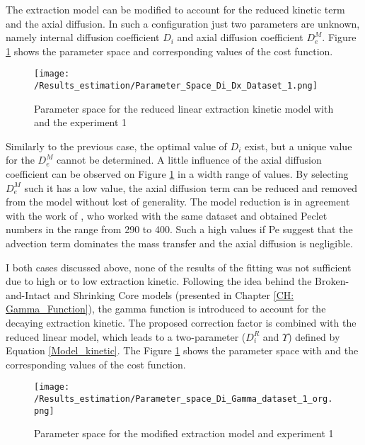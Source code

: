 \documentclass[../Supercritical_fluid_extraction_of_essential_oil_from_chamomile.tex]{subfiles}
\begin{document}
	The extraction model can be modified to account for the reduced kinetic term and the axial diffusion. In such a configuration just two parameters are unknown, namely internal diffusion coefficient $D_i$ and axial diffusion coefficient $D_e^M$. Figure \ref{fig: Fit_1_Di_Dx} shows the parameter space and corresponding values of the cost function.
	
	\begin{figure}[!h]
		\centering
		\texttt{[image: /Results\_estimation/Parameter\_Space\_Di\_Dx\_Dataset\_1.png]}
		\caption{Parameter space for the reduced linear extraction kinetic model with and the experiment 1}
		\label{fig: Fit_1_Di_Dx}
	\end{figure}
	
	Similarly to the previous case, the optimal value of $D_i$ exist, but a unique value for the $D_e^M$ cannot be determined. A little influence of the axial diffusion coefficient can be observed on Figure \ref{fig: Fit_1_Di_Dx} in a width range of values. By selecting $D_e^M$ such it has a low value, the axial diffusion term can be reduced and removed from the model without lost of generality. The model reduction is in agreement with the work of \citet{Rahimi2011}, who worked with the same dataset and obtained Peclet numbers in the range from 290 to 400. Such a high values if Pe suggest that the advection term dominates the mass transfer and the axial diffusion is negligible.
	
	I both cases discussed above, none of the results of the fitting was not sufficient due to high or to low extraction kinetic. Following the idea behind the Broken-and-Intact and Shrinking Core models (presented in Chapter \ref{CH: Gamma_Function}), the gamma function is introduced to account for the decaying extraction kinetic. The proposed correction factor is combined with the reduced linear model, which leads to a two-parameter ($D_i^R$ and $\Upsilon$) defined by Equation \ref{Model_kinetic}. The Figure \ref{fig: Fit_1_Di_Dx} shows the parameter space with and the corresponding values of the cost function.
	
	\begin{figure}[!h]
		\centering
		\texttt{[image: /Results\_estimation/Parameter\_space\_Di\_Gamma\_dataset\_1\_org.png]}
		\caption{Parameter space for the modified extraction model and experiment 1}
		\label{fig: Fit_1_Di_Gamma}
	\end{figure}
	
\end{document}
